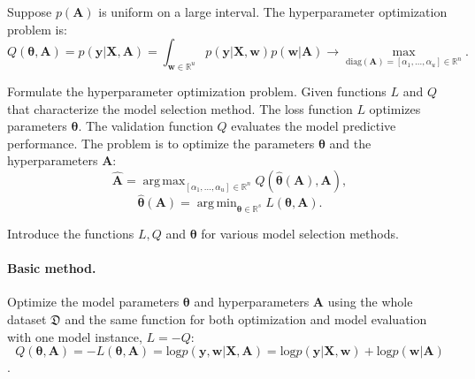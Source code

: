 \documentclass[12pt]{article}
\DeclareMathOperator*{\argmin}{arg\,min}
\DeclareMathOperator*{\argmax}{arg\,max}
\begin{document}
Suppose $p(\mathbf{A})$ is uniform on a large interval. The hyperparameter optimization problem is:
\begin{equation}
\label{eq:bayes2}
	Q(\boldsymbol{\theta}, \mathbf{A}) = p(\mathbf{y}|\mathbf{X},\mathbf{A}) = \int_{\mathbf{w} \in \mathbb{R}^u} p(\mathbf{y}|\mathbf{X}, \mathbf{w}) p(\mathbf{w}|\mathbf{A}) \to \max_{\text{diag}(\mathbf{A}) = [\alpha_1, \dots, \alpha_u] \in \mathbb{R}^{n}}.
\end{equation}


 
   


Formulate the hyperparameter optimization problem. Given functions $L$ and $Q$ that characterize the model selection method. The loss function $L$ optimizes parameters $\boldsymbol{\theta}$. The validation function $Q$ evaluates the model predictive performance.
The problem is to optimize the parameters $\boldsymbol{\theta}$ and the hyperparameters $\mathbf{A}$: 
\begin{equation}
\label{eq:main}
	\hat{\mathbf{A}} = \argmax_{[\alpha_1, \dots, \alpha_u] \in \mathbb{R}^n} Q(\hat{\boldsymbol{\theta}}(\mathbf{A}), \mathbf{A}),
\end{equation}
\begin{equation}
\label{eq:main2}
	\hat{\boldsymbol{\theta}}(\mathbf{A}) =  \argmin_{\boldsymbol{\theta} \in \mathbb{R}^s} L(\boldsymbol{\theta}, \mathbf{A}).
\end{equation}

Introduce the functions $L, Q$ and $\boldsymbol{\theta}$ for various model selection methods.

\paragraph{Basic method.}
Optimize the model parameters $\boldsymbol{\theta}$ and hyperparameters $\mathbf{A}$ using the whole dataset $\mathfrak{D}$ and the same function for both optimization and model evaluation with one model instance, $L = -Q$:
$$ Q(\boldsymbol{\theta}, \mathbf{A}) = -L(\boldsymbol{\theta}, \mathbf{A})  = \text{log}p(\mathbf{y}, \mathbf{w} | \mathbf{X}, \mathbf{A}) = \text{log} p(\mathbf{y}|\mathbf{X}, \mathbf{w})+\text{log}p(\mathbf{w}|\mathbf{A})$$.
\end{document}
